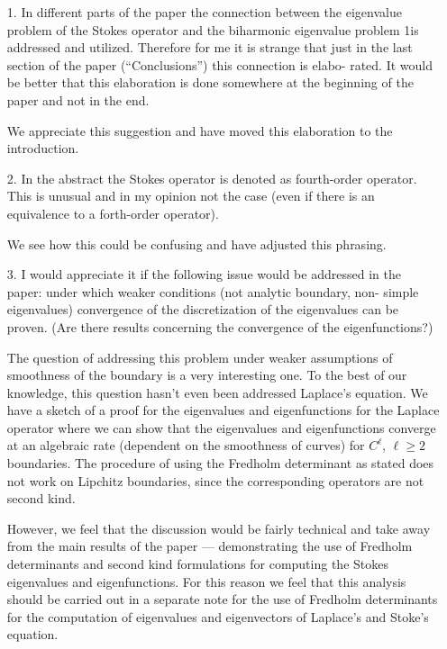 \documentclass{article}
\begin{document}
\begin{itemize}
\item[1.] {\color{blue} In different parts of the paper the connection between the eigenvalue
problem of the Stokes operator and the biharmonic eigenvalue problem
1is addressed and utilized. Therefore for me it is strange that just in
the last section of the paper (“Conclusions”) this connection is elabo-
rated. It would be better that this elaboration is done somewhere at
the beginning of the paper and not in the end.}

We appreciate this suggestion and have moved this elaboration to
the introduction. 

\item[2.] {\color{blue}
  In the abstract the Stokes operator is denoted as fourth-order operator.
This is unusual and in my opinion not the case (even if there is an
equivalence to a forth-order operator).}

We see how this could be confusing and have adjusted this phrasing.

\item[3.] {\color{blue} I would appreciate it if the following issue would be addressed in the
paper: under which weaker conditions (not analytic boundary, non-
simple eigenvalues) convergence of the discretization of the eigenvalues
can be proven. (Are there results concerning the convergence of the
eigenfunctions?)}

The question of addressing this problem under weaker assumptions of smoothness of the boundary
is a very interesting one. To the best of our knowledge, this question hasn't even been addressed 
Laplace's equation.
We have a sketch of a proof for the eigenvalues and eigenfunctions
for the Laplace operator where we can show that the eigenvalues and eigenfunctions
converge at an algebraic rate (dependent on the smoothness of curves) for $C^{\ell}$, $\ell\geq 2$ boundaries.
The procedure of using the Fredholm determinant as stated does not work on Lipchitz boundaries, since
the corresponding operators are not second kind. 

However, we feel that the discussion would be fairly technical and take away from the main results of 
the paper --- demonstrating the use of Fredholm determinants and second kind formulations for 
computing the Stokes eigenvalues and eigenfunctions.  For this reason we feel that this analysis should be carried out in a separate note for the use of Fredholm determinants for the computation of eigenvalues and eigenvectors of Laplace's and Stoke's equation.


\end{itemize}
\end{document}
